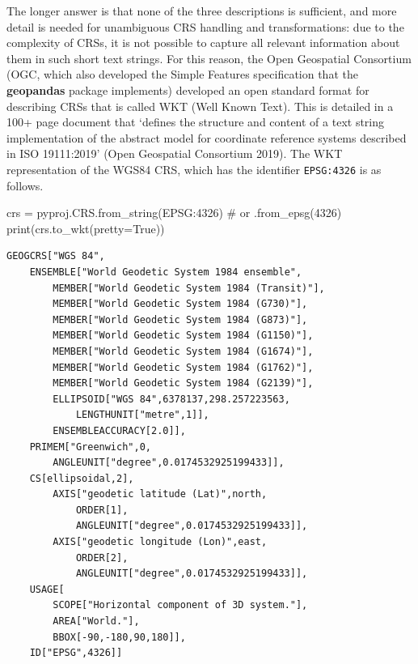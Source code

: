 \documentclass[
  letterpaper,
]{krantz}
\newenvironment{Shaded}{\begin{snugshade}}{\end{snugshade}}
\newcommand{\BuiltInTok}[1]{\textcolor[rgb]{0.00,0.23,0.31}{#1}}
\newcommand{\CommentTok}[1]{\textcolor[rgb]{0.37,0.37,0.37}{#1}}
\newcommand{\NormalTok}[1]{\textcolor[rgb]{0.00,0.23,0.31}{#1}}
\newcommand{\OperatorTok}[1]{\textcolor[rgb]{0.37,0.37,0.37}{#1}}
\newcommand{\StringTok}[1]{\textcolor[rgb]{0.13,0.47,0.30}{#1}}
\newcommand{\VariableTok}[1]{\textcolor[rgb]{0.07,0.07,0.07}{#1}}
\begin{document}
The longer answer is that none of the three descriptions is sufficient,
and more detail is needed for unambiguous CRS handling and
transformations: due to the complexity of CRSs, it is not possible to
capture all relevant information about them in such short text strings.
For this reason, the Open Geospatial Consortium (OGC, which also
developed the Simple Features specification that the \textbf{geopandas}
package implements) developed an open standard format for describing
CRSs that is called WKT (Well Known Text). This is detailed in a 100+
page document that `defines the structure and content of a text string
implementation of the abstract model for coordinate reference systems
described in ISO 19111:2019' (Open Geospatial Consortium 2019). The WKT
representation of the WGS84 CRS, which has the identifier
\texttt{EPSG:4326} is as follows.

\begin{Shaded}
\begin{Highlighting}[]
\NormalTok{crs }\OperatorTok{=}\NormalTok{ pyproj.CRS.from\_string(}\StringTok{\textquotesingle{}EPSG:4326\textquotesingle{}}\NormalTok{) }\CommentTok{\# or \textquotesingle{}.from\_epsg(4326)\textquotesingle{}}
\BuiltInTok{print}\NormalTok{(crs.to\_wkt(pretty}\OperatorTok{=}\VariableTok{True}\NormalTok{))}
\end{Highlighting}
\end{Shaded}

\begin{verbatim}
GEOGCRS["WGS 84",
    ENSEMBLE["World Geodetic System 1984 ensemble",
        MEMBER["World Geodetic System 1984 (Transit)"],
        MEMBER["World Geodetic System 1984 (G730)"],
        MEMBER["World Geodetic System 1984 (G873)"],
        MEMBER["World Geodetic System 1984 (G1150)"],
        MEMBER["World Geodetic System 1984 (G1674)"],
        MEMBER["World Geodetic System 1984 (G1762)"],
        MEMBER["World Geodetic System 1984 (G2139)"],
        ELLIPSOID["WGS 84",6378137,298.257223563,
            LENGTHUNIT["metre",1]],
        ENSEMBLEACCURACY[2.0]],
    PRIMEM["Greenwich",0,
        ANGLEUNIT["degree",0.0174532925199433]],
    CS[ellipsoidal,2],
        AXIS["geodetic latitude (Lat)",north,
            ORDER[1],
            ANGLEUNIT["degree",0.0174532925199433]],
        AXIS["geodetic longitude (Lon)",east,
            ORDER[2],
            ANGLEUNIT["degree",0.0174532925199433]],
    USAGE[
        SCOPE["Horizontal component of 3D system."],
        AREA["World."],
        BBOX[-90,-180,90,180]],
    ID["EPSG",4326]]
\end{verbatim}
\end{document}
